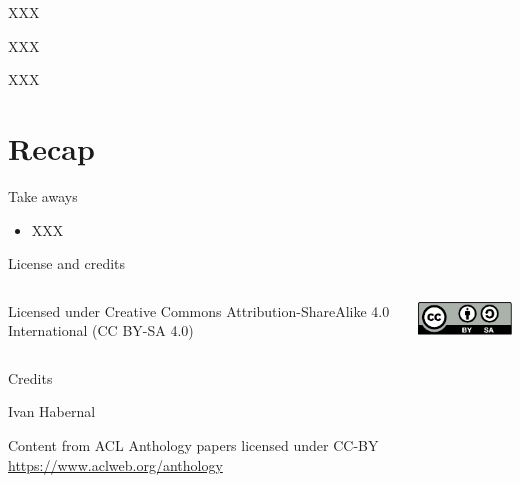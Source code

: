 \documentclass[12pt,aspectratio=169,handout]{beamer}
\begin{document}
\begin{frame}{XXX}
	
\end{frame}


\begin{frame}{XXX}
	
\end{frame}


\begin{frame}{XXX}
	
\end{frame}



\section*{Recap}

\begin{frame}{Take aways}
	
\begin{itemize}
	
	\item XXX
\end{itemize}
	
\end{frame}



\begin{frame}{License and credits}

	\begin{columns}
		\begin{column}{0.7\textwidth}
			Licensed under Creative Commons Attribution-ShareAlike 4.0 International (CC BY-SA 4.0)
		\end{column}
		\begin{column}{0.2\textwidth}
			\includegraphics[width=0.9\linewidth]{img/cc-by-sa-icon.pdf}
		\end{column}
	\end{columns}
	
	\bigskip
	
	Credits
	
	\begin{scriptsize}
		
		Ivan Habernal
		
		Content from ACL Anthology papers licensed under CC-BY \url{https://www.aclweb.org/anthology}
		
	\end{scriptsize}
	
\end{frame}
\end{document}
